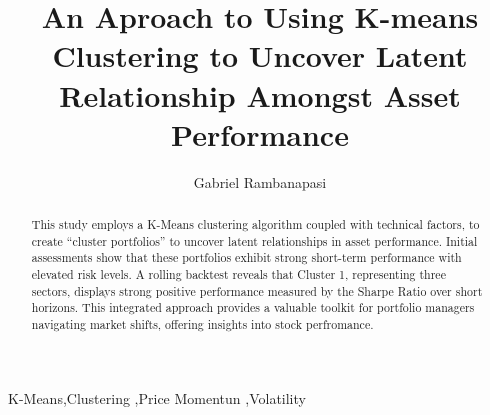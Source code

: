 \documentclass[11pt,preprint, authoryear]{elsarticle}
\numberwithin{equation}{section}
\numberwithin{figure}{section}
\numberwithin{table}{section}
\begin{document}
\begin{frontmatter}  %

\title{An Aproach to Using K-means Clustering to Uncover Latent
Relationship Amongst Asset Performance}





\author[Add1]{Gabriel Rambanapasi}





\address[Add1]{Stellenbosch University, Stellenbosch, South Africa}


\begin{abstract}
\small{
This study employs a K-Means clustering algorithm coupled with technical
factors, to create ``cluster portfolios'' to uncover latent
relationships in asset performance. Initial assessments show that these
portfolios exhibit strong short-term performance with elevated risk
levels. A rolling backtest reveals that Cluster 1, representing three
sectors, displays strong positive performance measured by the Sharpe
Ratio over short horizons. This integrated approach provides a valuable
toolkit for portfolio managers navigating market shifts, offering
insights into stock perfromance.
}
\end{abstract}

\vspace{1cm}


\begin{keyword}
\footnotesize{
K-Means\sep Clustering \sep Price Momentun \sep Volatility \\
\vspace{0.3cm}
}
\end{keyword}



\vspace{0.5cm}

\end{frontmatter}

\setcounter{footnote}{0}



\pagestyle{fancy}
\chead{}
\rhead{}
\lfoot{}
\lhead{}
\cfoot{}

\end{document}
